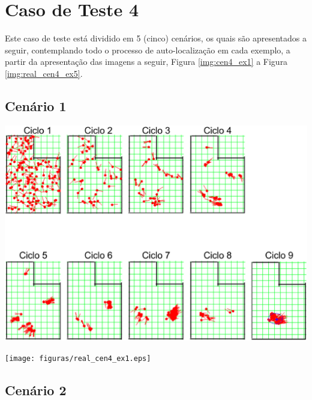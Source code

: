 \section{Caso de Teste 4}

Este caso de teste está dividido em 5 (cinco) cenários, os quais são apresentados a seguir, contemplando todo o processo de auto-localização
em cada exemplo, a partir da apresentação das imagens a seguir, Figura \ref{img:cen4_ex1} a Figura \ref{img:real_cen4_ex5}.

\subsection{Cenário 1}

{\centering
\includegraphics[scale=0.4]{figuras/cen4_ex1.eps}
\label{img:cen4_ex1}
\par}

{\centering
\texttt{[image: figuras/real\_cen4\_ex1.eps]}
\label{img:real_cen4_ex1}
\par}

\subsection{Cenário 2}


